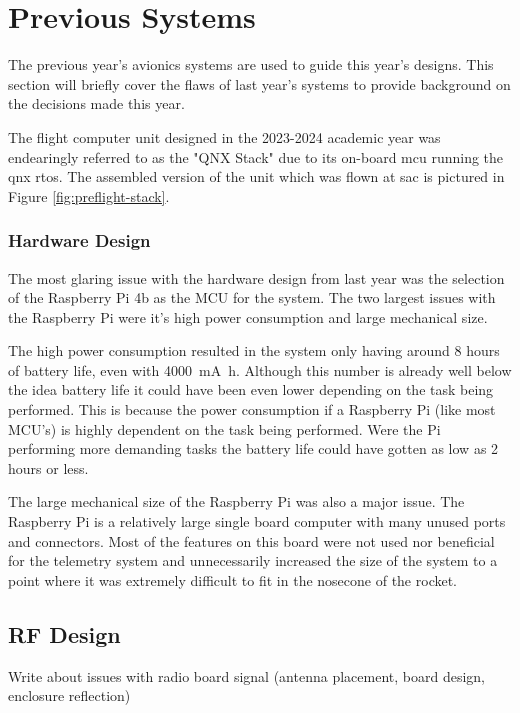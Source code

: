 \section{Previous Systems}

The previous year's avionics systems are used to guide this year's designs. This section will briefly cover the flaws of last year's systems to provide background on the decisions made this year.

The flight computer unit designed in the 2023-2024 academic year was endearingly referred to as the "QNX Stack" due to
its on-board \gls{mcu} running the \gls{qnx} \gls{rtos}. The assembled version of the unit which was flown at \gls{sac}
is pictured in Figure \ref{fig:preflight-stack}.

\subsubsection{Hardware Design}

The most glaring issue with the hardware design from last year was the selection of the Raspberry Pi 4b as the MCU for the system. The two largest issues with the Raspberry Pi were it's high power consumption and large mechanical size. 

The high power consumption resulted in the system only having around 8 hours of battery life, even with \qty{4000}{\milli\ampere\hour}. Although this number is already well below the idea battery life it could have been even lower depending on the task being performed. This is because the power consumption if a Raspberry Pi (like most MCU's) is highly dependent on the task being performed. Were the Pi performing more demanding tasks the battery life could have gotten as low as 2 hours or less.

The large mechanical size of the Raspberry Pi was also a major issue. The Raspberry Pi is a relatively large single board computer with many unused ports and connectors. Most of the features on this board were not used nor beneficial for the telemetry system and unnecessarily increased the size of the system to a point where it was extremely difficult to fit in the nosecone of the rocket.



\subsection{RF Design}
Write about issues with radio board signal (antenna placement, board design, enclosure reflection)

